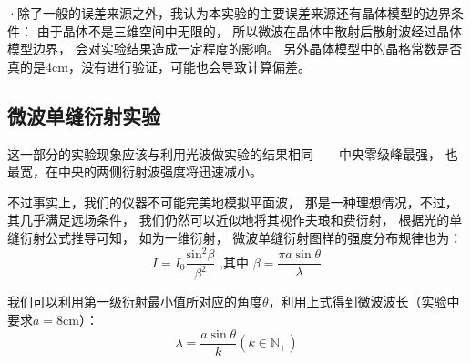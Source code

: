 \documentclass[11pt]{article}
\begin{document}
·除了一般的误差来源之外，我认为本实验的主要误差来源还有晶体模型的边界条件：
由于晶体不是三维空间中无限的，
所以微波在晶体中散射后散射波经过晶体模型边界，
会对实验结果造成一定程度的影响。
另外晶体模型中的晶格常数是否真的是4cm，没有进行验证，可能也会导致计算偏差。































\subsection{微波单缝衍射实验}

这一部分的实验现象应该与利用光波做实验的结果相同——中央零级峰最强，
也最宽，在中央的两侧衍射波强度将迅速减小。

不过事实上，我们的仪器不可能完美地模拟平面波，
那是一种理想情况，不过，其几乎满足远场条件，
我们仍然可以近似地将其视作夫琅和费衍射，
根据光的单缝衍射公式推导可知，
如为一维衍射，
微波单缝衍射图样的强度分布规律也为：
\begin{displaymath}
    I=I_0\frac{\mathrm{sin}^2 \beta}{{\beta}^2} \text{ ,其中 }
     \beta=\frac{\pi a\sin \theta}{\lambda}
\end{displaymath}

我们可以利用第一级衍射最小值所对应的角度$\theta$，利用上式得到微波波长（实验中要求$a=8$cm）：
\begin{displaymath}
    \lambda=\frac{a\sin \theta}{k}(k\in \mathbb N_+)
\end{displaymath}
\end{document}
